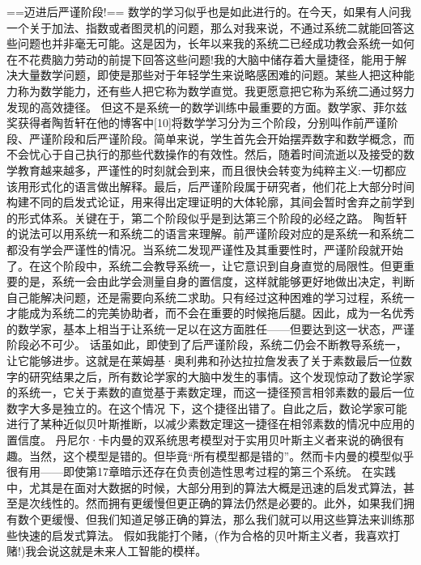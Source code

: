 ==迈进后严谨阶段!==
数学的学习似乎也是如此进行的。在今天，如果有人问我一个关于加法、指数或者图灵机的问题，那么对我来说，不通过系统二就能回答这些问题也并非毫无可能。这是因为，长年以来我的系统二已经成功教会系统一如何在不花费脑力劳动的前提下回答这些问题!我的大脑中储存着大量捷径，能用于解决大量数学问题，即使是那些对于年轻学生来说略感困难的问题。某些人把这种能力称为数学能力，还有些人把它称为数学直觉。我更愿意把它称为系统二通过努力发现的高效捷径。
但这不是系统一的数学训练中最重要的方面。数学家、菲尔兹奖获得者陶哲轩在他的博客中[10]将数学学习分为三个阶段，分别叫作前严谨阶段、严谨阶段和后严谨阶段。简单来说，学生首先会开始摆弄数字和数学概念，而不会忧心于自己执行的那些代数操作的有效性。然后，随着时间流逝以及接受的数学教育越来越多，严谨性的时刻就会到来，而且很快会转变为纯粹主义:一切都应该用形式化的语言做出解释。最后，后严谨阶段属于研究者，他们花上大部分时间构建不同的启发式论证，用来得出定理证明的大体轮廓，其间会暂时舍弃之前学到的形式体系。关键在于，第二个阶段似乎是到达第三个阶段的必经之路。
陶哲轩的说法可以用系统一和系统二的语言来理解。前严谨阶段对应的是系统一和系统二都没有学会严谨性的情况。当系统二发现严谨性及其重要性时，严谨阶段就开始了。在这个阶段中，系统二会教导系统一，让它意识到自身直觉的局限性。但更重要的是，系统一会由此学会测量自身的置信度，这样就能够更好地做出决定，判断自己能解决问题，还是需要向系统二求助。只有经过这种困难的学习过程，系统一才能成为系统二的完美协助者，而不会在重要的时候拖后腿。因此，成为一名优秀的数学家，基本上相当于让系统一足以在这方面胜任——但要达到这一状态，严谨阶段必不可少。
话虽如此，即使到了后严谨阶段，系统二仍会不断教导系统一，让它能够进步。这就是在莱姆基·奥利弗和孙达拉拉詹发表了关于素数最后一位数字的研究结果之后，所有数论学家的大脑中发生的事情。这个发现惊动了数论学家的系统一，它关于素数的直觉基于素数定理，而这一捷径预言相邻素数的最后一位数字大多是独立的。在这个情况
下，这个捷径出错了。自此之后，数论学家可能进行了某种近似贝叶斯推断，以减少素数定理这一捷径在相邻素数的情况中应用的置信度。
丹尼尔·卡内曼的双系统思考模型对于实用贝叶斯主义者来说的确很有趣。当然，这个模型是错的。但毕竟“所有模型都是错的”。然而卡内曼的模型似乎很有用——即使第17章暗示还存在负责创造性思考过程的第三个系统。
在实践中，尤其是在面对大数据的时候，大部分用到的算法大概是迅速的启发式算法，甚至是次线性的。然而拥有更缓慢但更正确的算法仍然是必要的。此外，如果我们拥有数个更缓慢、但我们知道足够正确的算法，那么我们就可以用这些算法来训练那些快速的启发式算法。
假如我能打个赌，(作为合格的贝叶斯主义者，我喜欢打赌!)我会说这就是未来人工智能的模样。